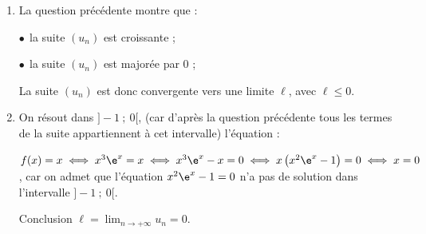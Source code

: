 \begin{enumerate}
\begin{enumerate}
On a donc par croissance de $f$ : $f(- 1) \leqslant f\left(u_n\right) \leqslant f\left(u_{n+1}\right)\leqslant f(0)$, ou encore :

$u_1\leqslant u_{n+1} \leqslant u_{n+2} \leqslant f(0)$	

et comme $u_1 \approx -0,338, \: \: - 1 \leqslant u_1$ et $f(0) = 0$, on a bien :

$- 1 \leqslant u_{n+1} \leqslant u_{n+2} \leqslant 0$.

La relation est vraie au rang $n + 1$.

Conclusion : l'encadrement est vrai au rang $0$ et s'il est vrai au rang $n,\:\:n \in \N$, il est encore vrai au rang $n + 1$ : d'après le principe de récurrence, pour tout entier naturel $n$, on a :
$1 \leqslant u_n \leqslant u_{n+1} \leqslant 0$.
		\item %
		
La question précédente montre que :
		
$\bullet~~$la suite $\left(u_n\right)$ est croissante ;

$\bullet~~$la suite $\left(u_n\right)$ est majorée par $0$ ;

La suite $\left(u_n\right)$ est donc convergente vers une limite $\ell$, avec $\ell \leqslant 0$.
		\item %


On résout dans $]- 1~;~0[$, (car d'après la question précédente tous les termes de la suite appartiennent à cet intervalle) l'équation  :

$f(x) = x \iff x^3\e^x = x \iff x^3\e^x - x = 0 \iff x\left(x^2\e^x - 1 \right) = 0 \iff x = 0$, car on admet que l'équation $x^2\e^x - 1 = 0$ n'a pas de solution dans l'intervalle $]- 1~;~0[$.

Conclusion $\ell = \displaystyle\lim_{n \to + \infty} u_n = 0$.
	\end{enumerate}
\end{enumerate}

\bigskip

